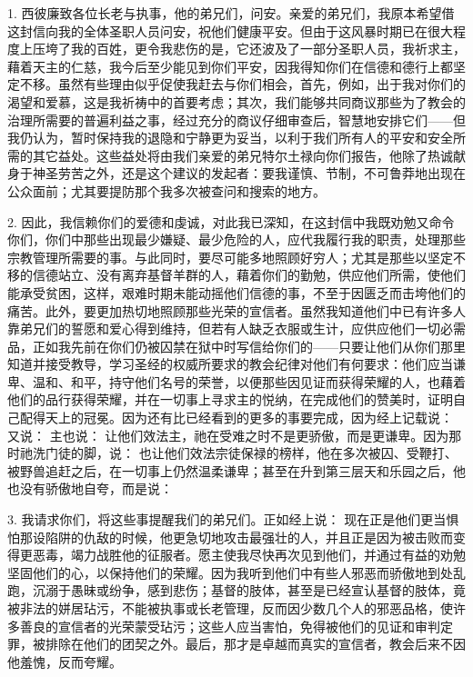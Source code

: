 1. 西彼廉致各位长老与执事，他的弟兄们，问安。亲爱的弟兄们，我原本希望借这封信向我的全体圣职人员问安，祝他们健康平安。但由于这风暴时期已在很大程度上压垮了我的百姓，更令我悲伤的是，它还波及了一部分圣职人员，我祈求主，藉着天主的仁慈，我今后至少能见到你们平安，因我得知你们在信德和德行上都坚定不移。虽然有些理由似乎促使我赶去与你们相会，首先，例如，出于我对你们的渴望和爱慕，这是我祈祷中的首要考虑；其次，我们能够共同商议那些为了教会的治理所需要的普遍利益之事，经过充分的商议仔细审查后，智慧地安排它们——但我仍认为，暂时保持我的退隐和宁静更为妥当，以利于我们所有人的平安和安全所需的其它益处。这些益处将由我们亲爱的弟兄特尔土禄向你们报告，他除了热诚献身于神圣劳苦之外，还是这个建议的发起者：要我谨慎、节制，不可鲁莽地出现在公众面前；尤其要提防那个我多次被查问和搜索的地方。\par

2. 因此，我信赖你们的爱德和虔诚，对此我已深知，在这封信中我既劝勉又命令你们，你们中那些出现最少嫌疑、最少危险的人，应代我履行我的职责，处理那些宗教管理所需要的事。与此同时，要尽可能多地照顾好穷人；尤其是那些以坚定不移的信德站立、没有离弃基督羊群的人，藉着你们的勤勉，供应他们所需，使他们能承受贫困，这样，艰难时期未能动摇他们信德的事，不至于因匮乏而击垮他们的痛苦。此外，要更加热切地照顾那些光荣的宣信者。虽然我知道他们中已有许多人靠弟兄们的誓愿和爱心得到维持，但若有人缺乏衣服或生计，应供应他们一切必需品，正如我先前在你们仍被囚禁在狱中时写信给你们的——只要让他们从你们那里知道并接受教导，学习圣经的权威所要求的教会纪律对他们有何要求：他们应当谦卑、温和、和平，持守他们名号的荣誉，以便那些因见证而获得荣耀的人，也藉着他们的品行获得荣耀，并在一切事上寻求主的悦纳，在完成他们的赞美时，证明自己配得天上的冠冕。因为还有比已经看到的更多的事要完成，因为经上记载说： 又说：  主也说：  让他们效法主，祂在受难之时不是更骄傲，而是更谦卑。因为那时祂洗门徒的脚，说： 也让他们效法宗徒保禄的榜样，他在多次被囚、受鞭打、被野兽追赶之后，在一切事上仍然温柔谦卑；甚至在升到第三层天和乐园之后，他也没有骄傲地自夸，而是说： \par

3. 我请求你们，将这些事提醒我们的弟兄们。正如经上说：  现在正是他们更当惧怕那设陷阱的仇敌的时候，他更急切地攻击最强壮的人，并且正是因为被击败而变得更恶毒，竭力战胜他的征服者。愿主使我尽快再次见到他们，并通过有益的劝勉坚固他们的心，以保持他们的荣耀。因为我听到他们中有些人邪恶而骄傲地到处乱跑，沉溺于愚昧或纷争，感到悲伤；基督的肢体，甚至是已经宣认基督的肢体，竟被非法的姘居玷污，不能被执事或长老管理，反而因少数几个人的邪恶品格，使许多善良的宣信者的光荣蒙受玷污；这些人应当害怕，免得被他们的见证和审判定罪，被排除在他们的团契之外。最后，那才是卓越而真实的宣信者，教会后来不因他羞愧，反而夸耀。\par

